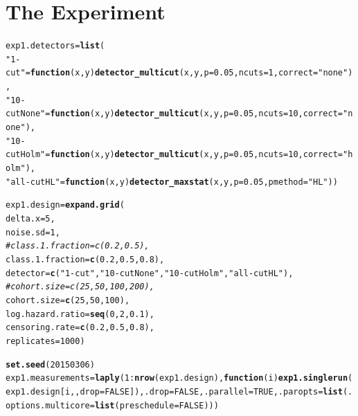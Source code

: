 \documentclass{article}\usepackage[]{graphicx}\usepackage[]{color}
\makeatletter
\newcommand{\hlnum}[1]{\textcolor[rgb]{0.686,0.059,0.569}{#1}}%
\newcommand{\hlstr}[1]{\textcolor[rgb]{0.192,0.494,0.8}{#1}}%
\newcommand{\hlcom}[1]{\textcolor[rgb]{0.678,0.584,0.686}{\textit{#1}}}%
\newcommand{\hlopt}[1]{\textcolor[rgb]{0,0,0}{#1}}%
\newcommand{\hlstd}[1]{\textcolor[rgb]{0.345,0.345,0.345}{#1}}%
\newcommand{\hlkwa}[1]{\textcolor[rgb]{0.161,0.373,0.58}{\textbf{#1}}}%
\newcommand{\hlkwb}[1]{\textcolor[rgb]{0.69,0.353,0.396}{#1}}%
\newcommand{\hlkwc}[1]{\textcolor[rgb]{0.333,0.667,0.333}{#1}}%
\newcommand{\hlkwd}[1]{\textcolor[rgb]{0.737,0.353,0.396}{\textbf{#1}}}%
\newenvironment{kframe}{%
 \def\at@end@of@kframe{}%
 \ifinner\ifhmode%
  \def\at@end@of@kframe{\end{minipage}}%
  \begin{minipage}{\columnwidth}%
 \fi\fi%
 \def\FrameCommand##1{\hskip\@totalleftmargin \hskip-\fboxsep
 \colorbox{shadecolor}{##1}\hskip-\fboxsep
     \hskip-\linewidth \hskip-\@totalleftmargin \hskip\columnwidth}%
 \MakeFramed {\advance\hsize-\width
   \@totalleftmargin\z@ \linewidth\hsize
   \@setminipage}}%
 {\par\unskip\endMakeFramed%
 \at@end@of@kframe}
\newenvironment{knitrout}{}{} %
\makeatother
\begin{document}
\section{The Experiment}
\begin{knitrout}
\color{fgcolor}\begin{kframe}
\begin{alltt}
\hlstd{exp1.detectors} \hlkwb{=} \hlkwd{list}\hlstd{(}
        \hlstr{"1-cut"} \hlstd{=} \hlkwa{function}\hlstd{(}\hlkwc{x}\hlstd{,} \hlkwc{y}\hlstd{)} \hlkwd{detector_multicut}\hlstd{(x, y,} \hlkwc{p} \hlstd{=} \hlnum{0.05}\hlstd{,} \hlkwc{ncuts} \hlstd{=} \hlnum{1}\hlstd{,} \hlkwc{correct} \hlstd{=} \hlstr{"none"}\hlstd{),}
        \hlstr{"10-cutNone"} \hlstd{=} \hlkwa{function}\hlstd{(}\hlkwc{x}\hlstd{,} \hlkwc{y}\hlstd{)} \hlkwd{detector_multicut}\hlstd{(x, y,} \hlkwc{p} \hlstd{=} \hlnum{0.05}\hlstd{,} \hlkwc{ncuts} \hlstd{=} \hlnum{10}\hlstd{,} \hlkwc{correct} \hlstd{=} \hlstr{"none"}\hlstd{),}
        \hlstr{"10-cutHolm"} \hlstd{=} \hlkwa{function}\hlstd{(}\hlkwc{x}\hlstd{,} \hlkwc{y}\hlstd{)} \hlkwd{detector_multicut}\hlstd{(x, y,} \hlkwc{p} \hlstd{=} \hlnum{0.05}\hlstd{,} \hlkwc{ncuts} \hlstd{=} \hlnum{10}\hlstd{,} \hlkwc{correct} \hlstd{=} \hlstr{"holm"}\hlstd{),}
        \hlstr{"all-cutHL"} \hlstd{=} \hlkwa{function}\hlstd{(}\hlkwc{x}\hlstd{,} \hlkwc{y}\hlstd{)} \hlkwd{detector_maxstat}\hlstd{(x, y,} \hlkwc{p} \hlstd{=} \hlnum{0.05}\hlstd{,} \hlkwc{pmethod} \hlstd{=} \hlstr{"HL"}\hlstd{))}

\hlstd{exp1.design} \hlkwb{=} \hlkwd{expand.grid}\hlstd{(}
        \hlkwc{delta.x} \hlstd{=} \hlnum{5}\hlstd{,}
        \hlkwc{noise.sd} \hlstd{=} \hlnum{1}\hlstd{,}
        \hlcom{# class.1.fraction = c(0.2, 0.5),}
        \hlkwc{class.1.fraction} \hlstd{=} \hlkwd{c}\hlstd{(}\hlnum{0.2}\hlstd{,} \hlnum{0.5}\hlstd{,} \hlnum{0.8}\hlstd{),}
        \hlkwc{detector} \hlstd{=} \hlkwd{c}\hlstd{(}\hlstr{"1-cut"}\hlstd{,} \hlstr{"10-cutNone"}\hlstd{,} \hlstr{"10-cutHolm"}\hlstd{,} \hlstr{"all-cutHL"}\hlstd{),}
        \hlcom{# cohort.size = c(25, 50, 100, 200),}
        \hlkwc{cohort.size} \hlstd{=} \hlkwd{c}\hlstd{(}\hlnum{25}\hlstd{,} \hlnum{50}\hlstd{,} \hlnum{100}\hlstd{),}
        \hlkwc{log.hazard.ratio} \hlstd{=} \hlkwd{seq}\hlstd{(}\hlnum{0}\hlstd{,} \hlnum{2}\hlstd{,} \hlnum{0.1}\hlstd{),}
        \hlkwc{censoring.rate} \hlstd{=} \hlkwd{c}\hlstd{(}\hlnum{0.2}\hlstd{,} \hlnum{0.5}\hlstd{,} \hlnum{0.8}\hlstd{),}
        \hlkwc{replicates} \hlstd{=} \hlnum{1000}\hlstd{)}

\hlkwd{set.seed}\hlstd{(}\hlnum{20150306}\hlstd{)}
\hlstd{exp1.measurements} \hlkwb{=} \hlkwd{laply}\hlstd{(}\hlnum{1}\hlopt{:}\hlkwd{nrow}\hlstd{(exp1.design),} \hlkwa{function}\hlstd{(}\hlkwc{i}\hlstd{)} \hlkwd{exp1.singlerun}\hlstd{(exp1.design[i,,}\hlkwc{drop}\hlstd{=}\hlnum{FALSE}\hlstd{]),} \hlkwc{.drop} \hlstd{=} \hlnum{FALSE}\hlstd{,} \hlkwc{.parallel} \hlstd{=} \hlnum{TRUE}\hlstd{,} \hlkwc{.paropts} \hlstd{=} \hlkwd{list}\hlstd{(}\hlkwc{.options.multicore} \hlstd{=} \hlkwd{list}\hlstd{(}\hlkwc{preschedule} \hlstd{=} \hlnum{FALSE}\hlstd{)))}
\end{alltt}
\end{kframe}
\end{knitrout}
\end{document}
